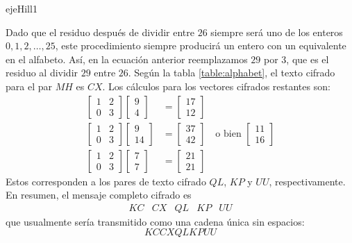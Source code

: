 \begin{examplebox}{}{ejeHill1}
\begin{nscenter}
    \end{nscenter}\newpage
    Dado que el residuo después de dividir entre $26$ siempre será uno de los enteros $0, 1, 2, \dots, 25$, este procedimiento siempre producirá un entero con un equivalente en el alfabeto. Así, en la ecuación anterior reemplazamos $29$ por $3$, que es el residuo al dividir $29$ entre $26$. Según la tabla \ref{table:alphabet}, el texto cifrado para el par $MH$ es $CX$. Los cálculos para los vectores cifrados restantes son:
    \begin{align*}
        \begin{bmatrix}
            1 & 2 \\
            0 & 3
        \end{bmatrix} \begin{bmatrix}
            9 \\
            4
        \end{bmatrix} & = \begin{bmatrix}
            17 \\
            12
        \end{bmatrix} \\
        \begin{bmatrix}
            1 & 2 \\
            0 & 3
        \end{bmatrix} \begin{bmatrix}
            9 \\
            14
        \end{bmatrix} & = \begin{bmatrix}
            37 \\
            42
        \end{bmatrix} \quad \text{o bien } \begin{bmatrix}
            11 \\
            16
        \end{bmatrix} \\
        \begin{bmatrix}
            1 & 2 \\
            0 & 3
        \end{bmatrix} \begin{bmatrix}
            7 \\
            7
        \end{bmatrix} & = \begin{bmatrix}
            21 \\
            21
        \end{bmatrix}
    \end{align*}
    Estos corresponden a los pares de texto cifrado $QL$, $KP$ y $UU$, respectivamente. En resumen, el mensaje completo cifrado es
    $$\begin{array}{ccccc}
        KC & CX & QL & KP & UU
    \end{array}$$
    que usualmente sería transmitido como una cadena única sin espacios:
    $$KCCXQLKPUU$$
\end{examplebox}

